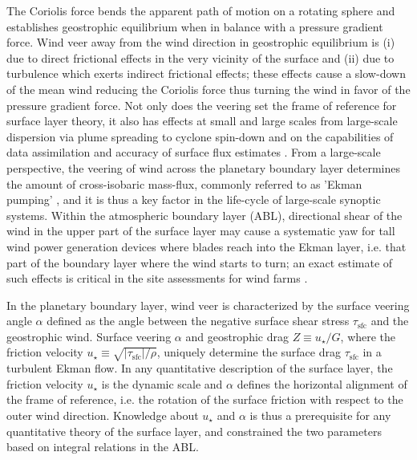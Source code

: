 \documentclass[smallcondensed,final]{svjour3}
\newcommand{\SFC}{\mathrm{sfc}}
\begin{document}
The Coriolis force bends the apparent path of motion on a rotating sphere and establishes geostrophic equilibrium when in balance with a pressure gradient force. Wind veer away from the wind direction in geostrophic equilibrium is
(i) due to direct frictional effects in the very vicinity of the surface and
(ii) due to turbulence which exerts indirect frictional effects; these effects
cause a slow-down of the mean wind reducing the Coriolis force thus turning the wind
in favor of the pressure gradient force. 
Not only does the veering set the frame of reference for surface layer theory, it also has
effects at small and large scales from large-scale dispersion via plume spreading to cyclone 
spin-down \citep{svensson:BM2009} and on the capabilities of data assimilation 
and accuracy of surface flux estimates \citep{brown:QJR2005}. 
%
From a large-scale perspective, the veering of wind across the planetary boundary layer determines
the amount of cross-isobaric mass-flux, commonly referred to as 'Ekman pumping' \citep{ekman:AMA1905},
and it is thus a key factor in the life-cycle of large-scale synoptic systems.
%
% 
Within the atmospheric boundary layer (ABL), directional shear of the wind in
the upper part of the surface layer may cause a systematic yaw for tall wind power generation devices
where blades reach into the Ekman layer, i.e. that part of the boundary layer where the wind starts to turn;
an exact estimate of such effects is critical in the site assessments for wind farms
\citep{calaf:PF2010, mirocha:WES2018}. 
%
\par
%
In the planetary boundary layer, wind veer is characterized by the surface veering angle $\alpha$
defined as the angle between the negative surface shear stress $\tau_\SFC$ and the geostrophic wind.
%
Surface veering $\alpha$ and geostrophic drag $Z\equiv u_\star/G$, where the friction velocity $u_\star\equiv\sqrt{|\tau_\SFC|/\rho}$,
uniquely determine the surface drag $\tau_\SFC$ in a turbulent Ekman flow. 
%
In any quantitative description of the surface layer, the friction velocity $u_\star$ is the dynamic scale
and $\alpha$ defines the horizontal alignment of the frame of reference, i.e. the rotation of the surface 
friction with respect to the outer wind direction. 
%
Knowledge about $u_\star$ and $\alpha$ is thus a prerequisite for any quantitative theory of the surface layer, 
and \citet{rossby:PIP1935} constrained the two parameters based on integral relations in the ABL.
\end{document}
